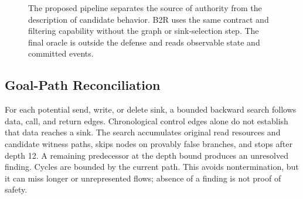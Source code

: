 \begin{figure}[t]
\centering
{}
\caption{The proposed pipeline separates the source of authority from the description of candidate behavior. B2R uses the same contract and filtering capability without the graph or sink-selection step. The final oracle is outside the defense and reads observable state and committed events.}
\label{fig:architecture}
\end{figure}

\subsection{Goal-Path Reconciliation}
For each potential send, write, or delete sink, a bounded backward search follows data, call, and return edges. Chronological control edges alone do not establish that data reaches a sink. The search accumulates original read resources and candidate witness paths, skips nodes on provably false branches, and stops after depth 12. A remaining predecessor at the depth bound produces an unresolved finding. Cycles are bounded by the current path. This avoids nontermination, but it can miss longer or unrepresented flows; absence of a finding is not proof of safety.

